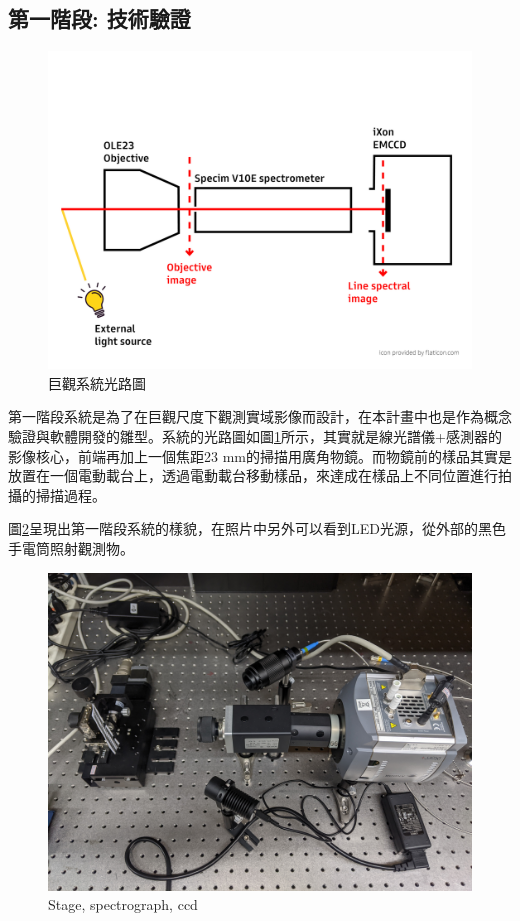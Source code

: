 \documentclass[12pt]{article}
\begin{document}
\subsection{第一階段: 技術驗證}
\begin{figure}
    \centering
    \includegraphics[width = 0.9\linewidth]{lightPath.jpg}
    \caption{巨觀系統光路圖}
    \label{fig: macro path}
\end{figure}
第一階段系統是為了在巨觀尺度下觀測實域影像而設計，在本計畫中也是作為概念驗證與軟體開發的雛型。系統的光路圖如圖\ref{fig: macro path}所示，其實就是線光譜儀+感測器的影像核心，前端再加上一個焦距23 mm的掃描用廣角物鏡。而物鏡前的樣品其實是放置在一個電動載台上，透過電動載台移動樣品，來達成在樣品上不同位置進行拍攝的掃描過程。

圖\ref{figure: 1 stage setup}呈現出第一階段系統的樣貌，在照片中另外可以看到LED光源，從外部的黑色手電筒照射觀測物。
\begin{figure}[h]
    \centering
    \includegraphics[width=0.65\linewidth]{PXL_20210723_094307842.jpg}
    \caption{Stage, spectrograph, ccd}
    \label{figure: 1 stage setup}
\end{figure}
\end{document}
